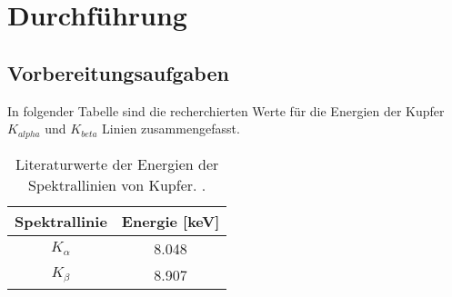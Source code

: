 \section{Durchführung}
\label{sec:Durchführung}
\subsection{Vorbereitungsaufgaben}
\label{sec:vorbereitung}
In folgender Tabelle sind die recherchierten Werte für die Energien der Kupfer $K_{alpha}$ und $K_{beta}$ 
Linien zusammengefasst.
\begin{table}[H]
    \centering
    \caption{Literaturwerte der Energien der Spektrallinien von Kupfer. \cite{AP03}.}
    \label{tab:brechungsind}
    \begin{tabular}{S S}
      \toprule
      {Spektrallinie} & {Energie [\si{\kilo\electronvolt}]} \\
      \midrule
    {$K_{\alpha}$} & 8.048 \\
    {$K_{\beta} $} & 8.907 \\
      \bottomrule
    \end{tabular}
  \end{table}